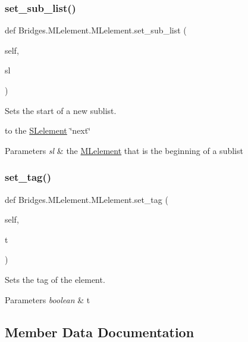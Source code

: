 \subsubsection{\texorpdfstring{set\+\_\+sub\+\_\+list()}{set\_sub\_list()}}
{\footnotesize\ttfamily def Bridges.\+M\+Lelement.\+M\+Lelement.\+set\+\_\+sub\+\_\+list (\begin{DoxyParamCaption}\item[{}]{self,  }\item[{}]{sl }\end{DoxyParamCaption})}



Sets the start of a new sublist. 

to the \mbox{\hyperlink{namespace_bridges_1_1_s_lelement}{S\+Lelement}} \char`\"{}next\char`\"{}


\begin{DoxyParams}{Parameters}
{\em sl} & the \mbox{\hyperlink{class_bridges_1_1_m_lelement_1_1_m_lelement}{M\+Lelement}} that is the beginning of a sublist \\
\hline
\end{DoxyParams}
\mbox{\label{class_bridges_1_1_m_lelement_1_1_m_lelement_a25d6a2e4524e4427b9f540fc41d44508}} 
\subsubsection{\texorpdfstring{set\+\_\+tag()}{set\_tag()}}
{\footnotesize\ttfamily def Bridges.\+M\+Lelement.\+M\+Lelement.\+set\+\_\+tag (\begin{DoxyParamCaption}\item[{}]{self,  }\item[{}]{t }\end{DoxyParamCaption})}



Sets the tag of the element. 


\begin{DoxyParams}{Parameters}
{\em boolean} & t \\
\hline
\end{DoxyParams}


\subsection{Member Data Documentation}
\mbox{\label{class_bridges_1_1_m_lelement_1_1_m_lelement_ae79f85968687b3c4c72bd56b836d0976}} 

